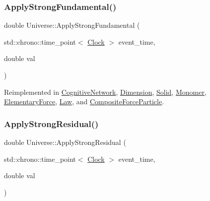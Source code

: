 \subsubsection{\texorpdfstring{Apply\+Strong\+Fundamental()}{ApplyStrongFundamental()}}
{\footnotesize\ttfamily double Universe\+::\+Apply\+Strong\+Fundamental (\begin{DoxyParamCaption}\item[{std\+::chrono\+::time\+\_\+point$<$ \mbox{\hyperlink{universe_8h_a0ef8d951d1ca5ab3cfaf7ab4c7a6fd80}{Clock}} $>$}]{event\+\_\+time,  }\item[{double}]{val }\end{DoxyParamCaption})\hspace{0.3cm}{\ttfamily [virtual]}}



Reimplemented in \mbox{\hyperlink{classCognitiveNetwork_af25bbd4f4d8f370cd2a48fd6db8302b9}{Cognitive\+Network}}, \mbox{\hyperlink{classDimension_afb01fb9e469da18899d4b14e5f095ece}{Dimension}}, \mbox{\hyperlink{classSolid_abd8fff76385306f97aa65dfd6b867fc6}{Solid}}, \mbox{\hyperlink{classMonomer_aa186454670f7796e196509238d419a35}{Monomer}}, \mbox{\hyperlink{classElementaryForce_a80f1977e777aa0c8cce2124b666e6446}{Elementary\+Force}}, \mbox{\hyperlink{classLaw_a57d05f26e1c0ee953260ebd3780248f8}{Law}}, and \mbox{\hyperlink{classCompositeForceParticle_a64fe19ee12d6ca0a69f650faa5bedb58}{Composite\+Force\+Particle}}.

\mbox{\label{classUniverse_af7becebb347be9a85541d96a3eca1ca7}} 
\subsubsection{\texorpdfstring{Apply\+Strong\+Residual()}{ApplyStrongResidual()}}
{\footnotesize\ttfamily double Universe\+::\+Apply\+Strong\+Residual (\begin{DoxyParamCaption}\item[{std\+::chrono\+::time\+\_\+point$<$ \mbox{\hyperlink{universe_8h_a0ef8d951d1ca5ab3cfaf7ab4c7a6fd80}{Clock}} $>$}]{event\+\_\+time,  }\item[{double}]{val }\end{DoxyParamCaption})\hspace{0.3cm}{\ttfamily [virtual]}}



